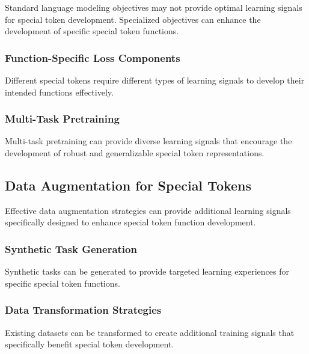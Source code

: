 Standard language modeling objectives may not provide optimal learning signals for special token development. Specialized objectives can enhance the development of specific special token functions.

\subsubsection{Function-Specific Loss Components}

Different special tokens require different types of learning signals to develop their intended functions effectively.

\subsubsection{Multi-Task Pretraining}

Multi-task pretraining can provide diverse learning signals that encourage the development of robust and generalizable special token representations.

\subsection{Data Augmentation for Special Tokens}

Effective data augmentation strategies can provide additional learning signals specifically designed to enhance special token function development.

\subsubsection{Synthetic Task Generation}

Synthetic tasks can be generated to provide targeted learning experiences for specific special token functions.

\subsubsection{Data Transformation Strategies}

Existing datasets can be transformed to create additional training signals that specifically benefit special token development.